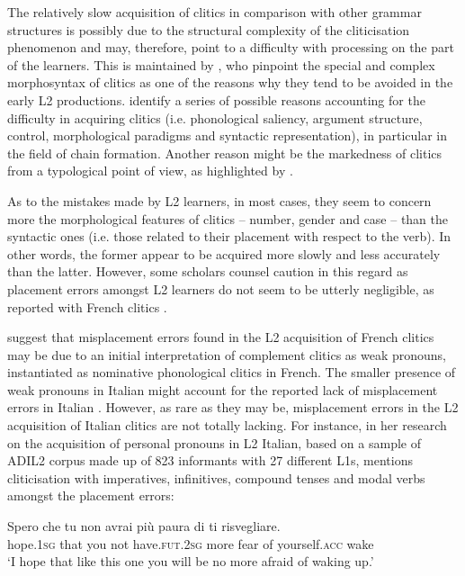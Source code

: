 \documentclass[output=paper,modfonts,nonflat,newtxmath]{langsci/langscibook}
\begin{document}
The relatively slow acquisition of clitics in comparison with other grammar structures is possibly due to the structural complexity of the cliticisation phenomenon and may, therefore, point to a difficulty with processing on the part of the learners. This is maintained by \citet{BellettiGuasti2015}, who pinpoint the special and complex morphosyntax of clitics as one of the reasons why they tend to be avoided in the early L2 productions. \citet{BottariEtAl2000} identify a series of possible reasons accounting for the difficulty in acquiring clitics (i.e. phonological saliency, argument structure, control, morphological paradigms and syntactic representation), in particular in the field of chain formation. Another reason might be the markedness of clitics from a typological point of view, as highlighted by \citet[329]{Berretta1986}.

As to the mistakes made by L2 learners, in most cases, they seem to concern more the morphological features of clitics – number, gender and case – than the syntactic ones (i.e. those related to their placement with respect to the verb). In other words, the former appear to be acquired more slowly and less accurately than the latter. However, some scholars counsel caution in this regard as placement errors amongst L2 learners do not seem to be utterly negligible, as reported with French clitics \citep{White1996, HulkMuller2000, BellettiHamann2004, GranfeldtSchlyter2004, HamannBelletti2006}.

\citet{HamannBelletti2006} suggest that misplacement errors found in the L2 acquisition of French clitics may be due to an initial interpretation of complement clitics as weak pronouns, instantiated as nominative phonological clitics in French. The smaller presence of weak pronouns in Italian might account for the reported lack of misplacement errors in Italian \citep{BellettiGuasti2015}. However, as rare as they may be, misplacement errors in the L2 acquisition of Italian clitics are not totally lacking. For instance, in her research on the acquisition of personal pronouns in L2 Italian, based on a sample of ADIL2 corpus made up of 823 informants with 27 different L1s, \citet[116]{Maffei2009} mentions cliticisation with imperatives, infinitives, compound tenses and modal verbs amongst the placement errors:

\ea \label{ex:sciutti:28}
    \gll Spero che tu non avrai più paura di ti risvegliare.\\
         hope.\textsc{1sg} that you not have.\textsc{fut.2sg} more fear of yourself.\textsc{acc} wake\\
    \glt  ‘I hope that like this one you will be no more afraid of waking up.’
\z
\end{document}
